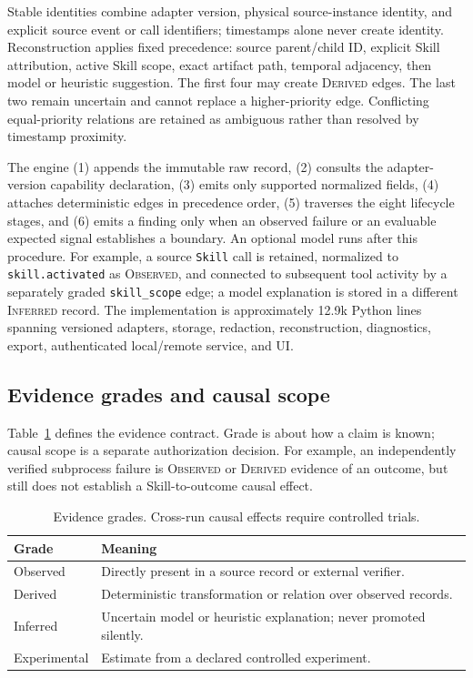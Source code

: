\documentclass[runningheads]{llncs}
\newcommand{\observed}{\textsc{Observed}\xspace}
\newcommand{\derived}{\textsc{Derived}\xspace}
\newcommand{\inferred}{\textsc{Inferred}\xspace}
\begin{document}
Stable identities combine adapter version, physical source-instance identity,
and explicit source event or call identifiers; timestamps alone never create
identity. Reconstruction applies fixed precedence: source parent/child ID,
explicit Skill attribution, active Skill scope, exact artifact path, temporal
adjacency, then model or heuristic suggestion. The first four may create
\derived edges. The last two remain uncertain and cannot replace a
higher-priority edge. Conflicting equal-priority relations are retained as
ambiguous rather than resolved by timestamp proximity.

The engine (1) appends the immutable raw record, (2) consults the
adapter-version capability declaration, (3) emits only supported normalized
fields, (4) attaches deterministic edges in precedence order, (5) traverses the
eight lifecycle stages, and (6) emits a finding only when an observed failure or
an evaluable expected signal establishes a boundary. An optional model runs
after this procedure. For example, a source \texttt{Skill} call is retained,
normalized to \texttt{skill.\allowbreak activated} as \observed, and connected to subsequent
tool activity by a separately graded \texttt{skill\_\allowbreak scope} edge; a model
explanation is stored in a different \inferred record. The implementation is
approximately 12.9k Python lines spanning versioned adapters, storage,
redaction, reconstruction, diagnostics, export, authenticated local/remote
service, and UI.

\subsection{Evidence grades and causal scope}

Table~\ref{tab:evidence} defines the evidence contract.  Grade is about how a
claim is known; causal scope is a separate authorization decision.  For example,
an independently verified subprocess failure is \observed or \derived evidence
of an outcome, but still does not establish a Skill-to-outcome causal effect.

\begin{table}[t]
\centering
\caption{Evidence grades. Cross-run causal effects require controlled trials.}
\label{tab:evidence}
\small
\begin{tabular}{@{}>{\raggedright\arraybackslash}p{}%
  >{\raggedright\arraybackslash}p{}@{}}
\toprule
Grade & Meaning \\
\midrule
Observed & Directly present in a source record or external verifier. \\
Derived & Deterministic transformation or relation over observed records. \\
Inferred & Uncertain model or heuristic explanation; never promoted silently. \\
Experimental & Estimate from a declared controlled experiment. \\
\bottomrule
\end{tabular}
\end{table}
\end{document}
